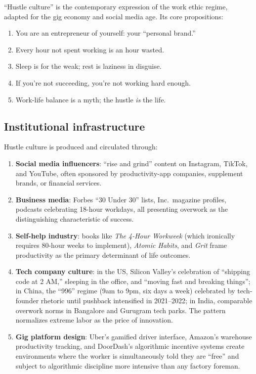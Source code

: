 ``Hustle culture'' is the contemporary expression of the work ethic regime, adapted for the gig economy and social media age.
Its core propositions:
\begin{enumerate}[nosep]
  \item You are an entrepreneur of yourself: your ``personal brand.''
  \item Every hour not spent working is an hour wasted.
  \item Sleep is for the weak; rest is laziness in disguise.
  \item If you're not succeeding, you're not working hard enough.
  \item Work-life balance is a myth; the hustle \emph{is} the life.
\end{enumerate}

\subsection{Institutional infrastructure}

Hustle culture is produced and circulated through:

\begin{enumerate}
  \item \textbf{Social media influencers}: ``rise and grind'' content on Instagram, TikTok, and YouTube, often sponsored by productivity-app companies, supplement brands, or financial services.

  \item \textbf{Business media}: Forbes ``30 Under 30'' lists, Inc.\ magazine profiles, podcasts celebrating 18-hour workdays, all presenting overwork as the distinguishing characteristic of success.

  \item \textbf{Self-help industry}: books like \emph{The 4-Hour Workweek} (which ironically requires 80-hour weeks to implement), \emph{Atomic Habits}, and \emph{Grit} frame productivity as the primary determinant of life outcomes.

  \item \textbf{Tech company culture}: in the US, Silicon Valley's celebration of ``shipping code at 2 AM,'' sleeping in the office, and ``moving fast and breaking things''; in China, the ``996'' regime (9am to 9pm, six days a week) celebrated by tech-founder rhetoric until pushback intensified in 2021--2022; in India, comparable overwork norms in Bangalore and Gurugram tech parks. The pattern normalizes extreme labor as the price of innovation.

  \item \textbf{Gig platform design}: Uber's gamified driver interface, Amazon's warehouse productivity tracking, and DoorDash's algorithmic incentive systems create environments where the worker is simultaneously told they are ``free'' and subject to algorithmic discipline more intensive than any factory foreman.
\end{enumerate}


